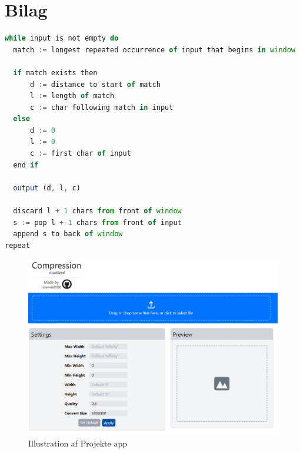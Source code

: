 \documentclass[12pt]{article}
\begin{document}
\section{Bilag}
\begin{lstlisting}[language=JavaScript, caption=LZ77 Pseudocode]
while input is not empty do
  match := longest repeated occurrence of input that begins in window
  
  if match exists then
      d := distance to start of match
      l := length of match
      c := char following match in input
  else
      d := 0
      l := 0
      c := first char of input
  end if
  
  output (d, l, c)
  
  discard l + 1 chars from front of window
  s := pop l + 1 chars from front of input
  append s to back of window
repeat

\end{lstlisting}
\begin{figure}[ht]%
  \centering
  \includegraphics[width=17cm]{Apppreview.png}
  \caption{\centering Illustration af Projekte app}
\end{figure}
\newpage
\printbibliography[title={Litteraturliste}]
\end{document}
